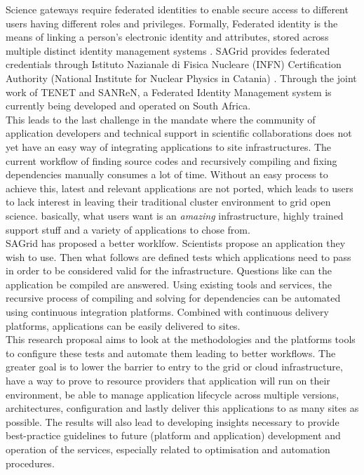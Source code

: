 \documentclass [titlepage,11pt]{article}
\begin{document}
Science gateways require federated identities to enable secure access to different users having different roles and privileges. Formally, Federated identity is the means of linking a person's electronic identity and attributes, stored across multiple distinct identity management systems \citep{federation}. SAGrid provides federated credentials through Istituto Nazianale di Fisica Nucleare (INFN) Certification Authority (National Institute for Nuclear Physics in Catania) \citep{identity}. Through the joint work of TENET and SANReN, a Federated Identity Management system is currently being developed and operated on South Africa. \\

This leads to the last challenge in the mandate where the community of application developers and technical support in scientific collaborations does not yet have an easy way of integrating applications to site infrastructures. The current workflow of finding source codes and recursively compiling and fixing dependencies manually consumes a lot of time. Without an easy process to achieve this, latest and relevant applications are not ported, which leads to users to lack interest in leaving their traditional cluster environment to grid open science. basically, what users want is an \emph{amazing} infrastructure, highly trained support stuff and a variety of applications to chose from. \\

SAGrid has proposed a better worklfow. Scientists propose an application they wish to use. Then what follows are
defined tests which applications need to pass in order to be considered valid for the infrastructure. Questions like can the application be compiled are answered. Using existing tools and services, the recursive process of compiling and solving for dependencies can be automated using continuous integration platforms. Combined with continuous delivery platforms, applications can be easily delivered to sites. \\ 

This research proposal aims to look at the methodologies and the platforms tools to configure these tests and automate them leading to better workflows. The greater goal is to lower the barrier to entry to the grid or cloud infrastructure, have a way to prove to resource providers that application will run on their environment, be able to manage application lifecycle across multiple versions, architectures, configuration and lastly deliver this applications to as many sites as possible.  The results will also lead to developing insights necessary to provide best-practice guidelines to future (platform and application) development and operation of the services, especially related to optimisation and automation procedures. \\
\end{document}
